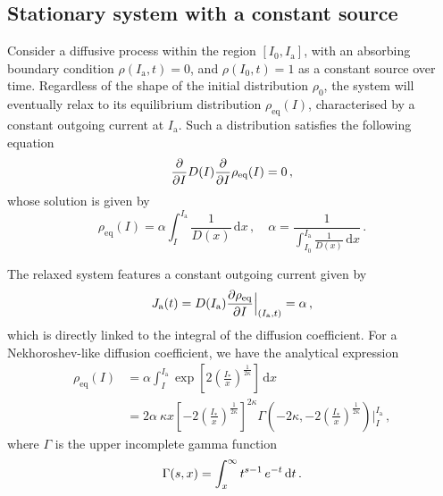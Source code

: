 
\subsection{Stationary system with a constant  source}\label{subsec:system_infinite_regime}


Consider a diffusive process within the region $[I_0, I_\mathrm{a}]$, with an absorbing boundary condition $\rho(I_\mathrm{a}, t) = 0$, and $\rho(I_0, t) = 1$ as a constant source over time. Regardless of the shape of the initial distribution $\rho_0$, the system will eventually relax to its equilibrium distribution $\rho_\text{eq}(I)$, characterised by a constant outgoing current at $I_\mathrm{a}$. Such a distribution satisfies the following equation
\begin{equation}
    \pdv{I} D(I) \pdv{I} \rho_{\text{eq}}(I) = 0 \,,
\end{equation}
whose solution is given by
\begin{equation}
    \rho_\text{eq}(I) = \alpha \int_I^{I_\mathrm{a}} \frac{1}{D(x)}\,\mathrm{d}x \,, \quad \alpha = \frac{1}{ \displaystyle{\int_{I_0}^{I_\mathrm{a}} \frac{1}{D(x)}\,\mathrm{d}x}} \, .
    \label{eq:equilibrium_stationary_distribution}
\end{equation}

The relaxed system features a constant outgoing current given by
\begin{equation}
    J_\mathrm{a}(t) = D(I_\mathrm{a})\pdv{\rho_\text{eq}}{I}\Bigr|_{(I_\mathrm{a},t)} = \alpha\,,
    \label{eq:equilibrium_stationary_current}
\end{equation} 
which is directly linked to the integral of the diffusion coefficient. For a Nekhoroshev-like diffusion coefficient, we have the analytical expression
\begin{equation}
    \begin{aligned}
        \rho_\text{eq}(I) &= \alpha \int_I^{I_\mathrm{a}} \exp\left[2\left(\frac{I_\ast}{x}\right)^{\frac{1}{2\kappa}}\right] \,\mathrm{d}x \\
        &= 2\alpha\ \kappa x \left[-2\left(\frac{I_\ast}{x}\right)^{\frac{1}{2\kappa}}\right]^{2\kappa} \Gamma\left(-2\kappa, -2\left(\frac{I_\ast}{x}\right)^{\frac{1}{2\kappa}}\right)\Bigg|_I^{I_\mathrm{a}}\,,
    \end{aligned}
\end{equation}
where $\Gamma$ is the upper incomplete gamma function
\begin{equation}
    \Gamma(s,x) = \int_x^{\infty} t^{s-1}\,e^{-t}\,{\rm d}t \,.
\end{equation}

